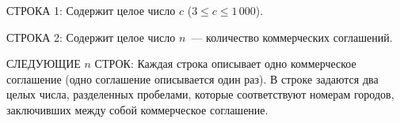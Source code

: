 СТРОКА 1: Содержит целое число $c$ ($3 \le c \le 1\,000$).

СТРОКА 2: Содержит целое число $n$~--- количество коммерческих соглашений.

СЛЕДУЮЩИЕ $n$ СТРОК: Каждая строка описывает одно коммерческое соглашение (одно соглашение описывается один раз). В строке задаются два целых числа, разделенных пробелами, которые соответствуют номерам городов, заключивших между собой коммерческое соглашение. 